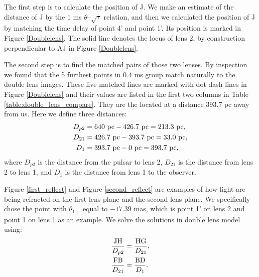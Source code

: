 \documentclass[useAMS,usenatbib]{mn2e}
\begin{document}

The first step is to calculate the position of J. We make an estimate
of the distance of J by the $1$ ms $\theta$--$\sqrt{\tau}$ relation,
and then we calculated the position of J by matching the time delay of
point 4' and point 1'. Its position is marked  in 
Figure \ref{Doublelens}.  The solid line denotes the locus of lens 2,
by construction perpendicular to AJ in Figure 
\ref{Doublelens}.

The second step is to find the matched pairs of those two lenses. By
inspection we found that the 5 furthest points in $0.4$ ms group match
naturally to the double lens images.  These five matched lines are marked with dot dash lines in Figure \ref{Doublelens} and their values are listed in the first two columns in Table \ref{table:double_lens_compare}. They are the located at a distance $393.7$ pc away from us. Here we define three distances:
\begin{equation}
\begin{aligned}
D_{p2}&=640~{\rm pc}-426.7~{\rm pc} =213.3~{\rm pc},\\
D_{21}&=426.7~{\rm pc}-393.7~{\rm pc} =33.0~{\rm pc},\\
D_{1}&=393.7~{\rm pc}- 0~{\rm pc} = 393.7~{\rm pc}, 
\end{aligned} 
\end{equation}
where $D_{p2}$ is the distance from the pulsar to lens 2, $D_{21}$ is the distance from lens 2 to lens 1, and $D_{1}$ is the distance from lens 1 to the observer.

Figure \ref{first_reflect} and Figure \ref{second_reflect} are examples of how light are being refracted on the first lens plane and the second lens plane. We specifically chose the point with $\theta_{1\parallel}$ equal to $-17.39$ mas, which is point 1' on lens 2 and point 1 on lens 1 as an example. We solve the solutions in double lens model using:
\begin{equation}
\begin{aligned}
\frac{\rm JH}{D_{p2}}&=\frac{\rm HG}{D_{21}},\\
\frac{\rm FB}{D_{21}}&=\frac{\rm BD}{D_{1}}.
\end{aligned}
\end{equation}
\end{document}

